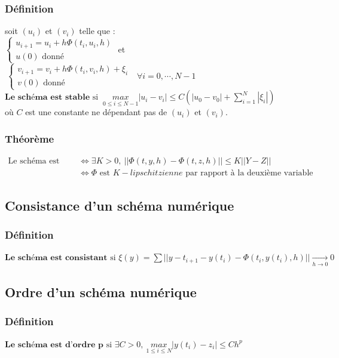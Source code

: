 \documentclass[a4paper,10pt]{report}
\begin{document}
\subsubsection{Définition}
soit $(u_i)$ et $(v_i)$ telle que :\\
$\left\lbrace
\begin{array}{l}
u_{i+1}=u_i+h\Phi (t_i,u_i,h) \\
u(0) \text{ donné}
\end{array}\right.$
et  
$\ \left\lbrace
\begin{array}{l}
v_{i+1}=v_i+h\Phi (t_i,v_i,h) + \xi _i \\
v(0) \text{ donné}
\end{array}\right.
\ \ \ \forall i=0,\cdots , N-1$ \\
$\textbf{Le schéma est stable} \text{ si } \ \underset{0\leq i \leq N-1}{max} |u_i-v_i|\leq C \left( |u_0-v_0|+\sum \limits_{i=1}^N |\xi _i| \right)$\\
où $C$ est une constante ne dépendant pas de $(u_i)$ et $(v_i)$.

\subsubsection{Théorème}
\abovedisplayskip=0mm
\begin{align*}
   \text{Le schéma est stable} & \Leftrightarrow \exists K>0, \ ||\Phi(t,y,h)-\Phi(t,z,h)||\leq K||Y-Z|| \\
							   & \Leftrightarrow \Phi \text{ est } K-lipschitzienne \text{ par rapport à la deuxième variable}
\end{align*} 

\subsection{Consistance d'un schéma numérique}
\subsubsection{Définition}
$\textbf{Le schéma est consistant} \text{ si } \xi(y)=\sum ||y-t_{i+1}-y(t_i)-\Phi(t_i,y(t_i),h)|| \underset{h\rightarrow 0}{\longrightarrow} 0$

\subsection{Ordre d'un schéma numérique}
\subsubsection{Définition}
$\textbf{Le schéma est d'ordre p} \text{ si } \exists C > 0, \ \underset{1\leq i \leq N}{max} |y(t_i)-z_i| \leq Ch^p $
\end{document}
